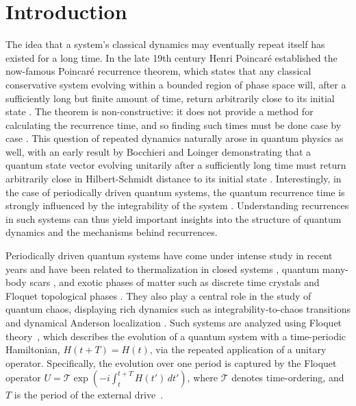 \documentclass[a4paper,onecolumn,accepted=2026-04-08,10pt]{quantumarticle}
\theoremstyle{definition}
\begin{document}
\section{Introduction}\label{sec:introduction}

The idea that a system's classical dynamics may eventually repeat itself has existed for a long time. In the late 19th century Henri Poincaré established the now-famous Poincaré recurrence theorem, which states that any classical conservative system evolving within a bounded region of phase space will, after a sufficiently long but finite amount of time, return arbitrarily close to its initial state \cite{poincar_1890_avantpropos}.  
The theorem is non-constructive: it does not provide a method for calculating the recurrence time, and so finding such times must be done case by case \cite{gimeno_upper_2017,suskind_complexity_2018, alvaro_recurrence_2023, rauer_recurrence_science_2018,freedman_quantumrecurrent_2024,levesque_rec_time_2025,ropotenko_the_2025,kotowski_tightboundsrecurrencetime_2026}.  
This question of repeated dynamics naturally arose in quantum physics as well, with an early result by Bocchieri and Loinger demonstrating that a quantum state vector evolving unitarily after a sufficiently long time must return arbitrarily close in Hilbert-Schmidt distance to its initial state \cite{bocchieri_1957_quantum}.
Interestingly, in the case of periodically driven quantum systems, the quantum recurrence time is strongly influenced by the integrability of the system \cite{venuti_2015_the}. Understanding recurrences in such systems can thus yield important insights into the structure of quantum dynamics and the mechanisms behind recurrences.

Periodically driven quantum systems have come under intense study in recent years and have been related to thermalization in closed systems \cite{kaufman_2016_quantum}, quantum many-body scars \cite{Pai_and_Pretko_scar_2019,Sen_scar_2020,Norio_scars_2020}, and exotic phases of matter such as discrete time crystals and Floquet topological phases \cite{roy_2017_floquet,sacha_2017_time,khemani_2019_a}. They also play a central role in the study of quantum chaos, displaying rich dynamics such as integrability-to-chaos transitions and dynamical Anderson localization \cite{Izrailev_Shepelyanskii_1980, fishman_rotor_anderson_1982}. 
Such systems are analyzed using Floquet theory~\cite{gfloquet_1883}, which describes the evolution of a quantum system with a time-periodic Hamiltonian, $H(t+T)=H(t)$, via the repeated application of a unitary operator. Specifically, the evolution over one period is captured by the Floquet operator $
U = \mathcal{T} \exp\left(-i \int_t^{t+T} H(t') \, dt'\right)$,
where $\mathcal{T}$ denotes time-ordering, and $T$ is the period of the external drive~\cite{grifoni_driven_1998}.
\end{document}
